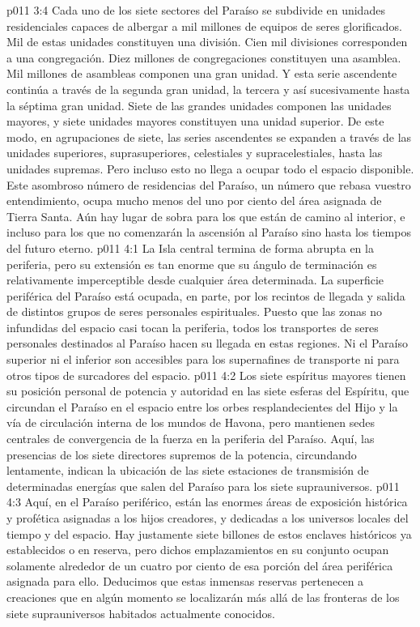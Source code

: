 \vs p011 3:4 Cada uno de los siete sectores del Paraíso se subdivide en unidades residenciales capaces de albergar a mil millones de equipos de seres glorificados. Mil de estas unidades constituyen una división. Cien mil divisiones corresponden a una congregación. Diez millones de congregaciones constituyen una asamblea. Mil millones de asambleas componen una gran unidad. Y esta serie ascendente continúa a través de la segunda gran unidad, la tercera y así sucesivamente hasta la séptima gran unidad. Siete de las grandes unidades componen las unidades mayores, y siete unidades mayores constituyen una unidad superior. De este modo, en agrupaciones de siete, las series ascendentes se expanden a través de las unidades superiores, suprasuperiores, celestiales y supracelestiales, hasta las unidades supremas. Pero incluso esto no llega a ocupar todo el espacio disponible. Este asombroso número de residencias del Paraíso, un número que rebasa vuestro entendimiento, ocupa mucho menos del uno por ciento del área asignada de Tierra Santa. Aún hay lugar de sobra para los que están de camino al interior, e incluso para los que no comenzarán la ascensión al Paraíso sino hasta los tiempos del futuro eterno.
\vs p011 4:1 La Isla central termina de forma abrupta en la periferia, pero su extensión es tan enorme que su ángulo de terminación es relativamente imperceptible desde cualquier área determinada. La superficie periférica del Paraíso está ocupada, en parte, por los recintos de llegada y salida de distintos grupos de seres personales espirituales. Puesto que las zonas no infundidas del espacio casi tocan la periferia, todos los transportes de seres personales destinados al Paraíso hacen su llegada en estas regiones. Ni el Paraíso superior ni el inferior son accesibles para los supernafines de transporte ni para otros tipos de surcadores del espacio.
\vs p011 4:2 Los siete espíritus mayores tienen su posición personal de potencia y autoridad en las siete esferas del Espíritu, que circundan el Paraíso en el espacio entre los orbes resplandecientes del Hijo y la vía de circulación interna de los mundos de Havona, pero mantienen sedes centrales de convergencia de la fuerza en la periferia del Paraíso. Aquí, las presencias de los siete directores supremos de la potencia, circundando lentamente, indican la ubicación de las siete estaciones de transmisión de determinadas energías que salen del Paraíso para los siete suprauniversos.
\vs p011 4:3 Aquí, en el Paraíso periférico, están las enormes áreas de exposición histórica y profética asignadas a los hijos creadores, y dedicadas a los universos locales del tiempo y del espacio. Hay justamente siete billones de estos enclaves históricos ya establecidos o en reserva, pero dichos emplazamientos en su conjunto ocupan solamente alrededor de un cuatro por ciento de esa porción del área periférica asignada para ello. Deducimos que estas inmensas reservas pertenecen a creaciones que en algún momento se localizarán más allá de las fronteras de los siete suprauniversos habitados actualmente conocidos.
